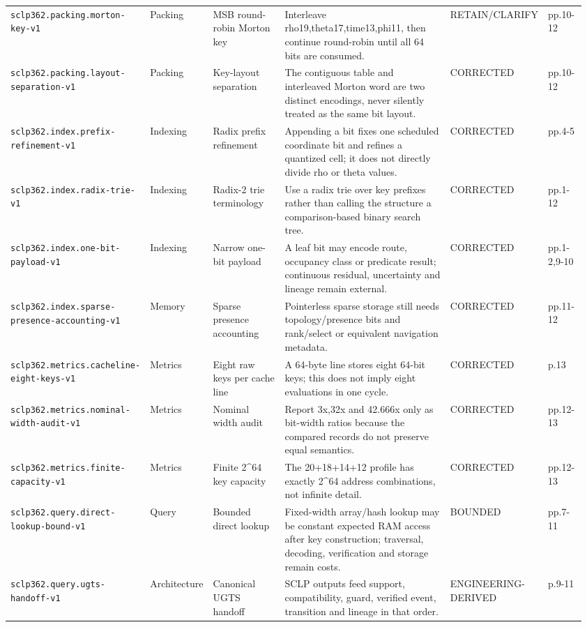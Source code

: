 \begin{landscape}
\begin{longtable}{p{0.19\linewidth} p{0.08\linewidth} p{0.15\linewidth} p{0.37\linewidth} p{0.10\linewidth} p{0.07\linewidth}}
\texttt{sclp362.packing.morton-key-v1} & Packing & MSB round-robin Morton key & Interleave rho19,theta17,time13,phi11, then continue round-robin until all 64 bits are consumed. & RETAIN/CLARIFY & pp.10-12\\
\texttt{sclp362.packing.layout-separation-v1} & Packing & Key-layout separation & The contiguous table and interleaved Morton word are two distinct encodings, never silently treated as the same bit layout. & CORRECTED & pp.10-12\\
\texttt{sclp362.index.prefix-refinement-v1} & Indexing & Radix prefix refinement & Appending a bit fixes one scheduled coordinate bit and refines a quantized cell; it does not directly divide rho or theta values. & CORRECTED & pp.4-5\\
\texttt{sclp362.index.radix-trie-v1} & Indexing & Radix-2 trie terminology & Use a radix trie over key prefixes rather than calling the structure a comparison-based binary search tree. & CORRECTED & pp.1-12\\
\texttt{sclp362.index.one-bit-payload-v1} & Indexing & Narrow one-bit payload & A leaf bit may encode route, occupancy class or predicate result; continuous residual, uncertainty and lineage remain external. & CORRECTED & pp.1-2,9-10\\
\texttt{sclp362.index.sparse-presence-accounting-v1} & Memory & Sparse presence accounting & Pointerless sparse storage still needs topology/presence bits and rank/select or equivalent navigation metadata. & CORRECTED & pp.11-12\\
\texttt{sclp362.metrics.cacheline-eight-keys-v1} & Metrics & Eight raw keys per cache line & A 64-byte line stores eight 64-bit keys; this does not imply eight evaluations in one cycle. & CORRECTED & p.13\\
\texttt{sclp362.metrics.nominal-width-audit-v1} & Metrics & Nominal width audit & Report 3x,32x and 42.666x only as bit-width ratios because the compared records do not preserve equal semantics. & CORRECTED & pp.12-13\\
\texttt{sclp362.metrics.finite-capacity-v1} & Metrics & Finite 2\textasciicircum{}64 key capacity & The 20+18+14+12 profile has exactly 2\textasciicircum{}64 address combinations, not infinite detail. & CORRECTED & pp.12-13\\
\texttt{sclp362.query.direct-lookup-bound-v1} & Query & Bounded direct lookup & Fixed-width array/hash lookup may be constant expected RAM access after key construction; traversal, decoding, verification and storage remain costs. & BOUNDED & pp.7-11\\
\texttt{sclp362.query.ugts-handoff-v1} & Architecture & Canonical UGTS handoff & SCLP outputs feed support, compatibility, guard, verified event, transition and lineage in that order. & ENGINEERING-DERIVED & p.9-11\\
\bottomrule
\end{longtable}
\end{landscape}
